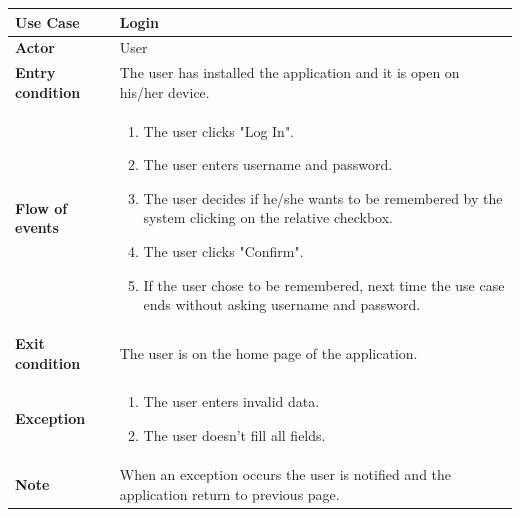 \documentclass[../main.tex]{subfiles}
\begin{document}
	\begin{center}
		\begin{tabular}{p{3cm}p{8.28cm}}
			\hline
			\textbf{Use Case} & Login\\
			\hline
			\textbf{Actor} & User\\
			\hline
			\textbf{Entry condition} & The user has installed the application and it is open on his/her device.\\
			\hline
			\textbf{Flow of events} & \begin{enumerate}
				\linespread{0}\item The user clicks "Log In".
				\linespread{0}\item The user enters username and password.
				\linespread{0}\item The user decides if he/she wants to be remembered by the system clicking on the relative checkbox.
				\linespread{0}\item The user clicks "Confirm".
				\linespread{0}\item If the user chose to be remembered, next time the use case ends without asking username and password.
			\end{enumerate}\\
			\hline
			\textbf{Exit condition} & The user is on the home page of the application.\\
			\hline
			\textbf{Exception} & \begin{enumerate}
				\linespread{0}\item The user enters invalid data.
				\linespread{0}\item The user doesn't fill all fields.
			\end{enumerate}\\
			\hline
			\textbf{Note} & When an exception occurs the user is notified and the application return to previous page.\\
			\hline
		\end{tabular}
	\end{center}
	\vspace*{3cm}
\end{document}
